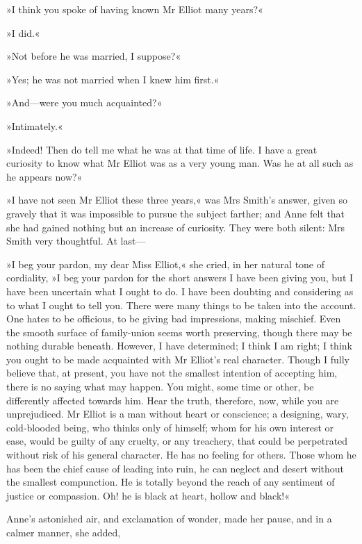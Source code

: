 »I think you spoke of having known Mr Elliot many years?«

»I did.«

»Not before he was married, I suppose?«

»Yes; he was not married when I knew him first.«

»And—were you much acquainted?«

»Intimately.«

»Indeed! Then do tell me what he was at that time of life. I have a great curiosity to know what Mr Elliot was as a very young man. Was he at all such as he appears now?«

»I have not seen Mr Elliot these three years,« was Mrs Smith's answer, given so gravely that it was impossible to pursue the subject farther; and Anne felt that she had gained nothing but an increase of curiosity. They were both silent: Mrs Smith very thoughtful. At last—

»I beg your pardon, my dear Miss Elliot,« she cried, in her natural tone of cordiality, »I beg your pardon for the short answers I have been giving you, but I have been uncertain what I ought to do. I have been doubting and considering as to what I ought to tell you. There were many things to be taken into the account. One hates to be officious, to be giving bad impressions, making mischief. Even the smooth surface of family-union seems worth preserving, though there may be nothing durable beneath. However, I have determined; I think I am right; I think you ought to be made acquainted with Mr Elliot's real character. Though I fully believe that, at present, you have not the smallest intention of accepting him, there is no saying what may happen. You might, some time or other, be differently affected towards him. Hear the truth, therefore, now, while you are unprejudiced. Mr Elliot is a man without heart or conscience; a designing, wary, cold-blooded being, who thinks only of himself; whom for his own interest or ease, would be guilty of any cruelty, or any treachery, that could be perpetrated without risk of his general character. He has no feeling for others. Those whom he has been the chief cause of leading into ruin, he can neglect and desert without the smallest compunction. He is totally beyond the reach of any sentiment of justice or compassion. Oh! he is black at heart, hollow and black!«

Anne's astonished air, and exclamation of wonder, made her pause, and in a calmer manner, she added,

